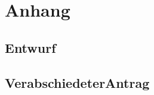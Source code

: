 \documentclass[12pt,a4paper]{scrartcl}
\begin{document}
\section*{Anhang}
\subsection*{Entwurf} \label{An:1}
%
\subsection*{VerabschiedeterAntrag} \label{An:2}
%
\end{document}
